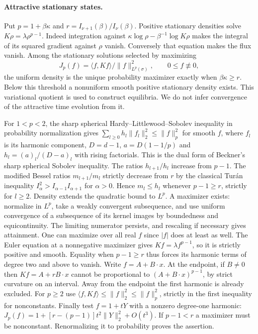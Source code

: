 \documentclass[10pt]{article}
\begin{document}
\paragraph{Attractive stationary states.} Put $p=1+\beta\kappa$ and $r=I_{\nu+1}(\beta)/I_\nu(\beta)$. Positive stationary densities solve $K\rho=\lambda\rho^{p-1}$. Indeed integration against $\kappa\log\rho-\beta^{-1}\log K\rho$ makes the integral of its squared gradient against $\rho$ vanish. Conversely that equation makes the flux vanish. Among the stationary solutions selected by maximizing
\[
 J_p(f)=\langle f,Kf\rangle/\|f\|_{L^p(\sigma)}^2,\qquad 0\le f\not\equiv0,
\]
the uniform density is the unique probability maximizer exactly when $\beta\kappa\ge r$. Below this threshold a nonuniform smooth positive stationary density exists. This variational quotient is used to construct equilibria. We do not infer convergence of the attractive time evolution from it.

For $1<p<2$, the sharp spherical Hardy--Littlewood--Sobolev inequality in probability normalization gives $\sum_{l\ge0} h_l\|f_l\|_2^2\le\|f\|_p^2$ for smooth $f$, where $f_l$ is its harmonic component, $D=d-1$, $a=D(1-1/p)$ and $h_l=(a)_l/(D-a)_l$ with rising factorials. This is the dual form of Beckner's sharp spherical Sobolev inequality. The ratios $h_{l+1}/h_l$ increase from $p-1$. The modified Bessel ratios $m_{l+1}/m_l$ strictly decrease from $r$ by the classical Tur\'an inequality $I_\alpha^2>I_{\alpha-1}I_{\alpha+1}$ for $\alpha>0$. Hence $m_l\le h_l$ whenever $p-1\ge r$, strictly for $l\ge2$. Density extends the quadratic bound to $L^p$. A maximizer exists: normalize in $L^p$, take a weakly convergent subsequence, and use uniform convergence of a subsequence of its kernel images by boundedness and equicontinuity. The limiting numerator persists, and rescaling if necessary gives attainment. One can maximize over all real $f$ since $|f|$ does at least as well. The Euler equation at a nonnegative maximizer gives $Kf=\lambda f^{p-1}$, so it is strictly positive and smooth. Equality when $p-1\ge r$ thus forces its harmonic terms of degree two and above to vanish. Write $f=A+B\cdot x$. At the endpoint, if $B\ne0$ then $Kf=A+rB\cdot x$ cannot be proportional to $(A+B\cdot x)^{p-1}$, by strict curvature on an interval. Away from the endpoint the first harmonic is already excluded. For $p\ge2$ use $\langle f,Kf\rangle\le\|f\|_2^2\le\|f\|_p^2$, strictly in the first inequality for nonconstants. Finally test $f=1+tY$ with a nonzero degree-one harmonic: $J_p(f)=1+[r-(p-1)]t^2\|Y\|_2^2+O(t^3)$. If $p-1<r$ a maximizer must be nonconstant. Renormalizing it to probability proves the assertion.
\end{document}
